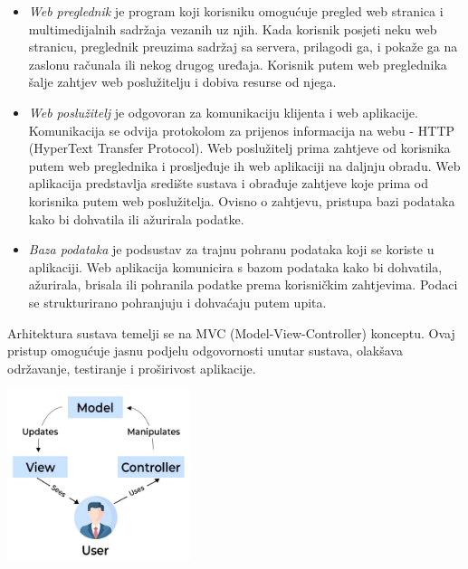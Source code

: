	\begin{itemize}
		\item \textit {Web preglednik} je program koji korisniku omogućuje pregled web stranica i multimedijalnih sadržaja vezanih uz njih. Kada korisnik posjeti neku web stranicu, preglednik preuzima sadržaj sa servera, prilagodi ga, i pokaže ga na zaslonu računala ili nekog drugog uređaja. Korisnik putem web preglednika šalje zahtjev web poslužitelju i dobiva resurse od njega.
		
		\item \textit {Web poslužitelj} je odgovoran za komunikaciju klijenta i web aplikacije. Komunikacija se odvija protokolom za prijenos informacija na webu - HTTP (HyperText Transfer Protocol). Web poslužitelj prima zahtjeve od korisnika putem web preglednika i prosljeđuje ih web aplikaciji na daljnju obradu. Web aplikacija predstavlja središte sustava i obrađuje zahtjeve koje prima od korisnika putem web poslužitelja. Ovisno o zahtjevu, pristupa bazi podataka kako bi dohvatila ili ažurirala podatke. 
		
		\item \textit {Baza podataka} je podsustav za trajnu pohranu podataka koji se koriste u aplikaciji. Web aplikacija komunicira s bazom podataka kako bi dohvatila, ažurirala, brisala ili pohranila podatke prema korisničkim zahtjevima. Podaci se strukturirano pohranjuju i dohvaćaju putem upita. \newline
		
	\end{itemize}
	
		Arhitektura sustava temelji se na MVC (Model-View-Controller) konceptu. Ovaj pristup omogućuje jasnu podjelu odgovornosti unutar sustava, olakšava održavanje, testiranje i proširivost aplikacije. 
		
		\begin{center}
			\includegraphics[width=0.4\textwidth]{slike/mvc.png} %
		\end{center}
		
